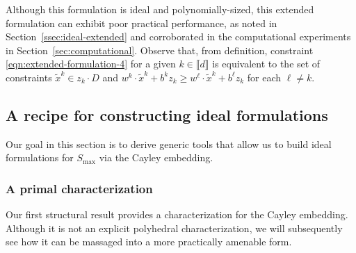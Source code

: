 \documentclass[smallextended]{svjour3}
\newcommand{\tx}{\widetilde{x}}
\newcommand{\Smax}{S_{\operatorname{max}}}
\begin{document}
Although this formulation is ideal and polynomially-sized, this extended formulation can exhibit poor practical performance, as noted in Section~\ref{ssec:ideal-extended} and corroborated in the computational experiments in Section~\ref{sec:computational}. Observe that, from definition, constraint \eqref{eqn:extended-formulation-4} for a given $k \in \llbracket d \rrbracket$ is equivalent to the set of constraints $\tx^k \in z_k \cdot D$ and $w^k \cdot \tx^k + b^kz_k \geq w^\ell \cdot \tx^k + b^\ell z_k$ for each $\ell \neq k$.

\subsection{A recipe for constructing ideal formulations} \label{ssec:ideal-recipe}
Our goal in this section is to derive generic tools that allow us to build ideal formulations for $\Smax$ via the Cayley embedding.

\subsubsection{A primal characterization}

Our first structural result provides a characterization for the Cayley embedding. Although it is not an explicit polyhedral characterization, we will subsequently see how it can be massaged into a more practically amenable form.
\end{document}
